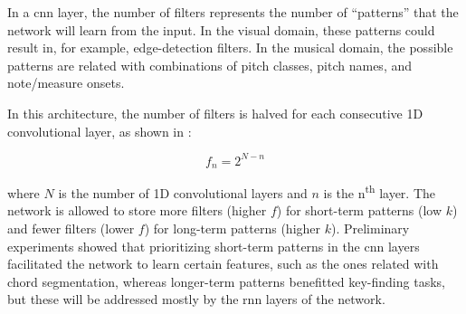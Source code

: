 
In a \gls{cnn} layer, the number of filters represents the
number of ``patterns'' that the network will learn from the
input. In the visual domain, these patterns could result in,
for example, edge-detection filters. In the musical domain,
the possible patterns are related with combinations of pitch
classes, pitch names, and note/measure onsets.

In this architecture, the number of filters is halved for
each consecutive 1D convolutional layer, as shown in
:

\begin{equation}
    \label{eq:number_of_filters}
    f_n = 2^{N - n}
\end{equation}

where $N$ is the number of 1D convolutional layers and $n$
is the n\textsuperscript{th} layer. The network is allowed
to store more filters (higher $f$) for short-term patterns
(low $k$) and fewer filters (lower $f$) for long-term
patterns (higher $k$). Preliminary experiments showed that
prioritizing short-term patterns in the \gls{cnn} layers
facilitated the network to learn certain features, such as
the ones related with chord segmentation, whereas
longer-term patterns benefitted key-finding tasks, but these
will be addressed mostly by the \gls{rnn} layers of the
network. 
